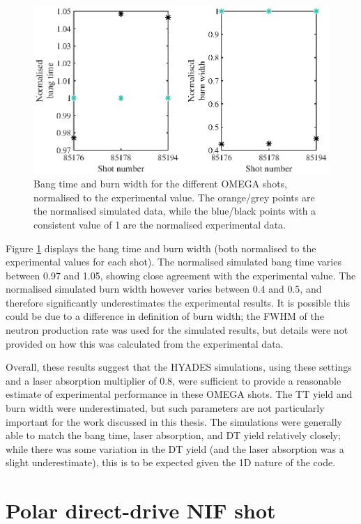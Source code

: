 \begin{figure}[ht]
\centering
\includegraphics{figures/LowCR/BenchmarkOmegaBT.eps}
\caption{Bang time and burn width for the different OMEGA shots, normalised to the experimental value. The orange/grey points are the normalised simulated data, while the blue/black points with a consistent value of 1 are the normalised experimental data.}
\label{fig:OmegaBT}
\end{figure}


Figure \ref{fig:OmegaBT} displays the bang time and burn width (both normalised to the experimental values for each shot). The normalised simulated bang time varies between 0.97 and 1.05, showing close agreement with the experimental value. The normalised simulated burn width however varies between 0.4 and 0.5, and therefore significantly underestimates the experimental results. It is possible this could be due to a difference in definition of burn width; the FWHM of the neutron production rate was used for the simulated results, but details were not provided on how this was calculated from the experimental data.

Overall, these results suggest that the HYADES simulations, using these settings and a laser absorption multiplier of 0.8, were sufficient to provide a reasonable estimate of experimental performance in these OMEGA shots. The TT yield and burn width were underestimated, but such parameters are not particularly important for the work discussed in this thesis. The simulations were generally able to match the bang time, laser absorption, and DT yield relatively closely; while there was some variation in the DT yield (and the laser absorption was a slight underestimate), this is to be expected given the 1D nature of the code.

\section{Polar direct-drive NIF shot}

